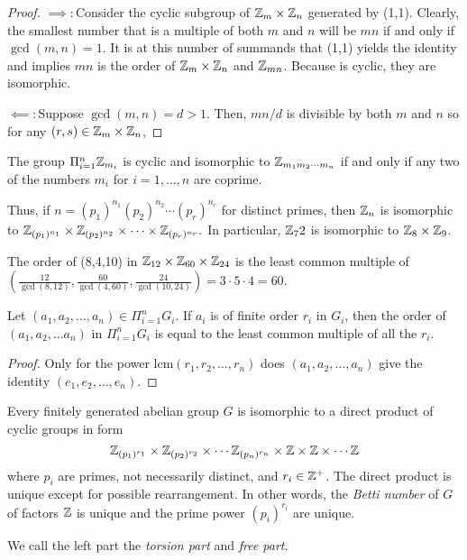 \begin{proof}
    $\implies\colon$Consider the cyclic subgroup of $\mathbb{Z}_m\times\mathbb{Z}_n$ generated by (1,1). Clearly, the smallest number that is a multiple of both $m$ and $n$ will be $mn$ if and only if $\gcd(m,n) = 1$. It is at this number of summands that (1,1) yields the identity and implies $mn$ is the order of $\mathbb{Z}_m\times\mathbb{Z}_n$ and $\mathbb{Z}_{mn}$. Because  is cyclic, they are isomorphic.

    $\impliedby\colon$Suppose $\gcd(m,n) = d > 1$. Then, $mn/d$ is divisible by both $m$ and $n$ so for any $(r,s) \in \mathbb{Z}_m\times\mathbb{Z}_n$, 
\end{proof}
\begin{corollary}
    The group $\Pi_{i=1}^n \mathbb{Z}_{m_i}$ is cyclic and isomorphic to $\mathbb{Z}_{m_1m_2\cdots m_n}$ if and only if any two of the numbers $m_i$ for $i = 1,\ldots, n$ are coprime.
\end{corollary}
\begin{example}
    Thus, if $n = (p_1)^{n_1}(p_2)^{n_2}\cdots(p_r)^{n_r}$ for distinct primes, then $\mathbb{Z}_n$ is isomorphic to $\mathbb{Z}_{(p_1)^{n_1}}\times \mathbb{Z}_{(p_2)^{n_2}}\times\cdots\times\mathbb{Z}_{(p_r)^{n_r}}.$ In particular, $\mathbb{Z}_72$ is isomorphic to $\mathbb{Z}_8\times\mathbb{Z}_9$.
\end{example}
\begin{example}
    The order of (8,4,10) in $\mathbb{Z}_{12}\times\mathbb{Z}_{60}\times\mathbb{Z}_{24}$ is the least common multiple of $(\frac{12}{\gcd(8,12)},\frac{60}{\gcd(4,60)},\frac{24}{\gcd(10,24)}) = 3\cdot5\cdot4=60.$
\end{example}
\begin{theorem}
    Let $(a_1, a_2, \ldots, a_n) \in \Pi_{i=1}^n G_i$. If $a_i$ is of finite order $r_i$ in $G_i$, then the order of $(a_1, a_2, \ldots a_n)$ in $\Pi_{i=1}^n G_i$ is equal to the least common multiple of all the $r_i$.
\end{theorem}
\begin{proof}
    Only for the power $\text{lcm}(r_1,r_2,\ldots,r_n)$ does $(a_1,a_2,\ldots,a_n)$ give the identity $(e_1,e_2,\ldots,e_n).$
\end{proof}
\begin{theorem}
    Every finitely generated abelian group $G$ is isomorphic to a direct product of cyclic groups in form $$\mathbb{Z}_{(p_1)^{r_1}}\times\mathbb{Z}_{(p_2)^{r_2}}\times\cdots\mathbb{Z}_{(p_n)^{r_n}}\times\mathbb{Z}\times\mathbb{Z}\times\cdots\mathbb{Z}$$ where $p_i$ are primes, not necessarily distinct, and $r_i \in \mathbb{Z}^+$. The direct product is unique except for possible rearrangement. In other words, the \emph{Betti number} of $G$ of factors $\mathbb{Z}$ is unique and the prime power $(p_i)^{r_i}$ are unique.

    We call the left part the \emph{torsion part} and \emph{free part}.
\end{theorem}
